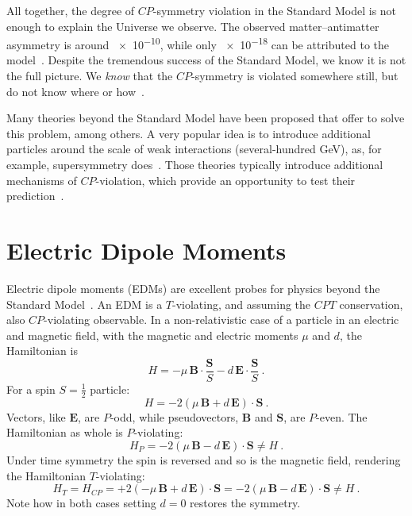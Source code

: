 All together, the degree of $CP$-symmetry violation in the Standard Model is not enough to explain the Universe we observe. The observed matter--antimatter asymmetry is around \num{e-10}, while only \num{e-18} can be attributed to the model~\cite{Riotto1999}. Despite the tremendous success of the Standard Model, we know it is not the full picture. We \emph{know} that the $CP$-symmetry is violated somewhere still, but do not know where or how~\cite{Pospelov2005}.%

Many theories beyond the Standard Model have been proposed that offer to solve this problem, among others. A very popular idea is to introduce additional particles around the scale of weak interactions (several-hundred GeV), as, for example, supersymmetry does~\cite{Supersymmetry}. Those theories typically introduce additional mechanisms of $CP$-violation, which provide an opportunity to test their prediction~\cite{Ellis1989}.



\section{Electric Dipole Moments}
Electric dipole moments (EDMs) are excellent probes for physics beyond the Standard Model~\cite{Pospelov2005}. An EDM is a $T$-violating, and assuming the $CPT$ conservation, also $CP$-violating observable. In a non-relativistic case of a particle in an electric and magnetic field, with the magnetic and electric moments $\mu$ and $d$, the Hamiltonian is
\begin{equation}
  H = - \mu \, \mathbf{B} \cdot \frac{\mathbf{S}}{S} - d \, \mathbf{E} \cdot \frac{\mathbf{S}}{S} \ .
\end{equation}
For a spin $S = \tfrac{1}{2}$ particle:
\begin{equation}
  H = - 2 \left( \mu \, \mathbf{B} + d \, \mathbf{E} \right ) \cdot \mathbf{S} \ .
\end{equation}
Vectors, like $\mathbf{E}$, are $P$-odd, while pseudovectors, $\mathbf{B}$ and $\mathbf{S}$, are $P$-even. The Hamiltonian as whole is $P$-violating:
\begin{equation}
  H_P = - 2 \left( \mu \, \mathbf{B} - d \, \mathbf{E} \right ) \cdot \mathbf{S} \neq H \ .
\end{equation}
Under time symmetry the spin is reversed and so is the magnetic field, rendering the Hamiltonian $T$-violating:
\begin{equation}
  H_T = H_{CP} = + 2 \left( - \mu \, \mathbf{B} + d \, \mathbf{E} \right ) \cdot \mathbf{S} = - 2 \left( \mu \, \mathbf{B} - d \, \mathbf{E} \right ) \cdot \mathbf{S} \neq H \ .
\end{equation}
Note how in both cases setting $d = 0$ restores the symmetry.

